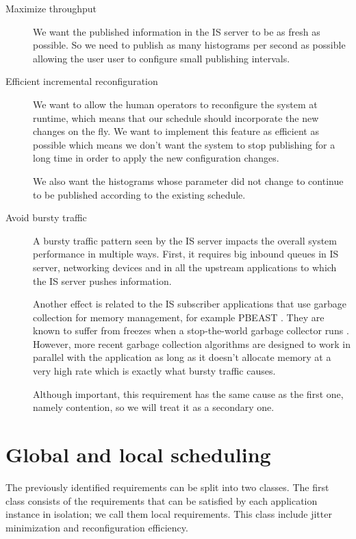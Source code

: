 \begin{description}
\item [Maximize throughput]

We want the published information in the IS server to be as fresh as possible. So we need to publish as many histograms per second as possible allowing the user user to configure small publishing intervals.

\item [Efficient incremental reconfiguration]

We want to allow the human operators to reconfigure the system at runtime, which means that our schedule should incorporate the new changes on the fly. We want to implement this feature as efficient as possible which means we don't want the system to stop publishing for a long time in order to apply the new configuration changes. 

We also want the histograms whose parameter did not change to continue to be published according to the existing schedule.

\item [Avoid bursty traffic]

A bursty traffic pattern seen by the IS server impacts the overall system performance in multiple ways. First, it requires big inbound queues in IS server, networking devices and in all the upstream applications to which the IS server pushes information. 

Another effect is related to the IS subscriber applications that use garbage collection for memory management, for example PBEAST \citep{sicoe2012persistent}. They are known to suffer from freezes when a stop-the-world garbage collector runs \citep{aho2007compilers}. However, more recent garbage collection algorithms \citep{printezis2005garbage} are designed to work in parallel with the application as long as it doesn't allocate memory at a very high rate which is exactly what bursty traffic causes.

Although important, this requirement has the same cause as the first one, namely contention, so we will treat it as a secondary one.

\end{description}

\section{Global and local scheduling}

The previously identified requirements can be split into two classes. The first class consists of the requirements that can be satisfied by each application instance in isolation; we call them local requirements. This class include jitter minimization and reconfiguration efficiency. 

